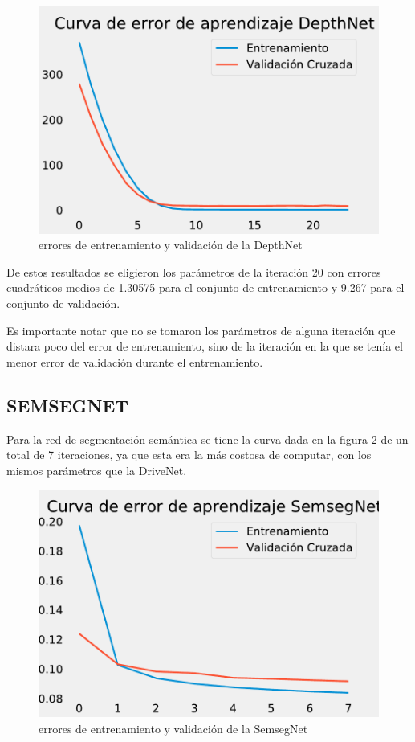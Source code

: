 \begin{figure}[H]
	\centering
	\includegraphics[scale=0.5]{imagenes/DepthNetCurve}
	\caption[Errores de entrenamiento y validación de la DepthNet]{errores de entrenamiento y validación de la DepthNet}
	\label{depthnetcurve}
\end{figure}

De estos resultados se eligieron los parámetros de la iteración 20 con errores cuadráticos medios de 1.30575 para el conjunto de entrenamiento y 9.267 para el conjunto de validación.

Es importante notar que no se tomaron los parámetros de alguna iteración que distara poco del error de entrenamiento, sino de la iteración en la que se tenía el menor error de validación durante el entrenamiento.

\subsection{SEMSEGNET}
Para la red de segmentación semántica se tiene la curva dada en la figura \ref{semsegnetcurve} de un total de 7 iteraciones, ya que esta era la más costosa de computar, con los mismos parámetros que la DriveNet.

\begin{figure}[H]
	\centering
	\includegraphics[scale=0.5]{imagenes/SemsegNetCurve}
	\caption[Errores de entrenamiento y validación de la SemsegNet]{errores de entrenamiento y validación de la SemsegNet}
	\label{semsegnetcurve}
\end{figure}

